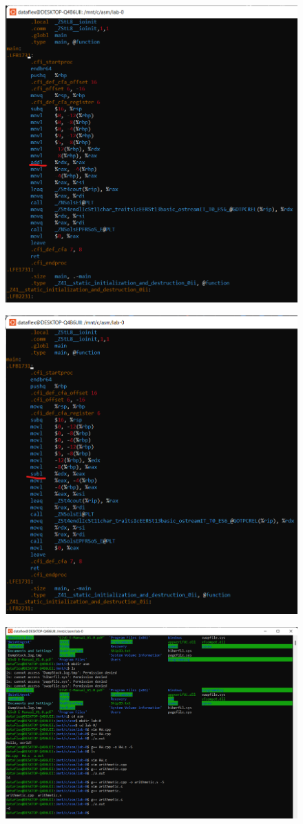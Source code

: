 \documentclass[a4paper,12pt]{article}
\begin{document}
\begin{figure}[h] %
	\centering
	\includegraphics[width=0.8\linewidth]{arithmetic add.png}
\end{figure}


\begin{figure}[h] %
	\centering
	\includegraphics[width=0.8\linewidth]{arithmetic sub.png}
\end{figure}


\begin{figure}[h] %
	\centering
	\includegraphics[width=0.8\linewidth]{arithmetic command line.png}
\end{figure}
\end{document}
